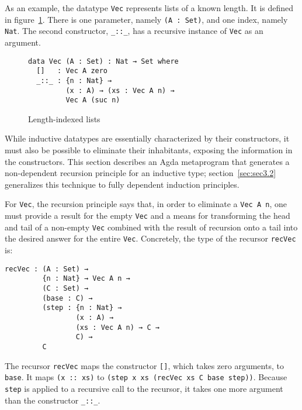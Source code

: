 \documentclass[sigplan,10pt]{acmart}
\begin{document}
As an example, the datatype \texttt{Vec} represents lists of a known length. It is defined in figure~\ref{fig:vec}.
There is one parameter, namely \texttt{(A : Set)}, and one index, namely \texttt{Nat}.
The second constructor, \texttt{\_::\_}, has a recursive instance of \texttt{Vec} as an argument.

\begin{figure}
\begin{center}
\begin{BVerbatim}
data Vec (A : Set) : Nat → Set where
  []   : Vec A zero
  _::_ : {n : Nat} →
         (x : A) → (xs : Vec A n) → 
         Vec A (suc n)
\end{BVerbatim}
\end{center}
\caption{Length-indexed lists}
\label{fig:vec}
\end{figure}




While inductive datatypes are essentially characterized by their constructors, it must also be possible to eliminate their inhabitants, exposing the information in the constructors.
This section describes an Agda metaprogram that generates a non-dependent recursion principle for an inductive type; section~\ref{sec:sec3.2} generalizes this technique to fully dependent induction principles.

For {\tt Vec}, the recursion principle says that, in order to eliminate a \texttt{Vec A n}, one must provide a result for the empty \texttt{Vec} and a means for transforming the head and tail of a non-empty \texttt{Vec} combined with the result of recursion onto a tail into the desired answer for the entire \texttt{Vec}.
Concretely, the type of the recursor \texttt{recVec} is:
\begin{center}
\begin{BVerbatim}
recVec : (A : Set) →
         {n : Nat} → Vec A n →
         (C : Set) →
         (base : C) →
         (step : {n : Nat} →
                 (x : A) →
                 (xs : Vec A n) → C →
                 C) →
         C
\end{BVerbatim}
\end{center}
The recursor \texttt{recVec} maps the constructor {\tt []}, which takes zero arguments, to \texttt{base}.
It maps \texttt{(x :: xs)} to {\tt (step x xs (recVec xs C base step))}.
Because \texttt{step} is applied to a recursive call to the recursor, it takes one more argument than the constructor \texttt{\_::\_}.
\end{document}
